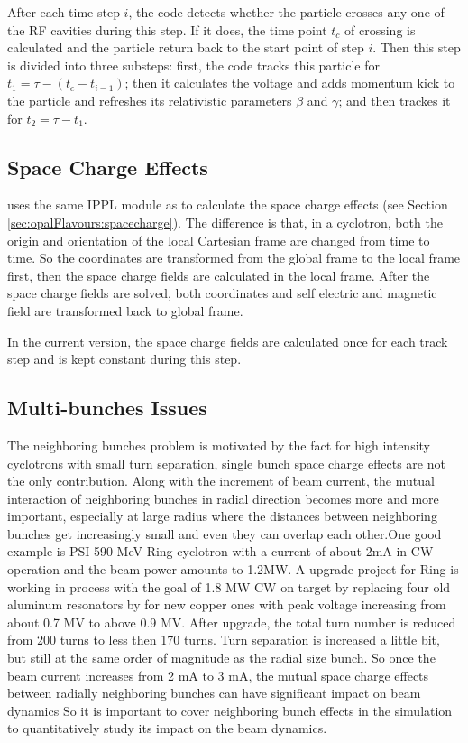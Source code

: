 After each time step $i$, the code detects whether the particle crosses any one of the RF cavities during this step.
If it does, the time point $t_c$ of crossing is calculated and the particle return back to the start point of 
step $i$. Then this step is divided into three substeps:
first, the code tracks this particle for $ t_1 = \tau - (t_c-t_{i-1})$;
then it calculates the voltage and adds momentum kick to the particle and refreshes its relativistic parameters $\beta$ and $\gamma$; 
and then trackes it for $t_2 = \tau - t_1$. 

\subsection{Space Charge Effects}  

\opalcycl uses the same IPPL module as \opalt to calculate the space charge effects (see Section \ref{sec:opalFlavours:spacecharge}).
The difference is that, in a cyclotron,
both the origin and orientation of the local Cartesian frame are changed from time to time. So the coordinates are transformed from 
the global frame to the local frame first, then the space charge fields are calculated in the local frame. 
After the space charge fields are solved, both coordinates and self electric and magnetic field are transformed back to global frame.
 
In the current version, the space charge fields are calculated once for each track step and is kept constant during this step.      

\subsection{Multi-bunches Issues}
\label{sec:opalcycl:MultiBunch}
				   
The neighboring bunches problem is motivated by the fact  for high intensity cyclotrons with small turn
separation, single bunch space charge effects are not the only contribution. Along with the increment of beam
current, the mutual interaction of neighboring bunches in radial direction becomes more and more important,
especially at large radius where the distances between neighboring bunches get increasingly small and even they
can overlap each other.One good example is PSI 590 MeV Ring cyclotron with a current of about 2mA in
CW operation and the beam power amounts to 1.2MW. A upgrade project for Ring is working in process with
the goal of 1.8 MW CW on target by replacing four old aluminum resonators by for new copper ones with peak
voltage increasing from about 0.7 MV to above 0.9 MV. After upgrade, the total turn 
number is reduced from 200 turns to less then 170 turns. 
Turn separation is increased a little bit, but still at the same order 
of magnitude as the radial size bunch. So once the beam current increases from 2 mA to 3 mA, the mutual space
charge effects between radially neighboring bunches can have significant impact on beam dynamics 
So it is important to cover neighboring bunch effects in the simulation to quantitatively study its impact on the beam dynamics.

